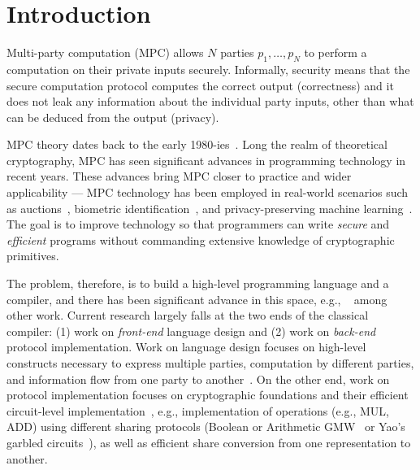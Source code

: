 \section{Introduction}
\label{sec:introduction}

Multi-party computation (MPC) allows $N$ parties $p_1,\dots, p_N$ to perform a computation on their private inputs securely. Informally, security means that the secure computation protocol computes the correct output (correctness) and it does not leak any information about the individual party inputs, other than what can be deduced from the output (privacy).


MPC theory dates back to the early 1980-ies~\cite{FOCS:Yao82b,STOC:GolMicWig87,STOC:BenGolWig88,STOC:ChaCreDam88}.
Long the realm of theoretical cryptography, MPC has seen significant advances in programming technology in recent years.
These advances bring MPC closer to practice and wider applicability ---
MPC technology has been employed in real-world scenarios such as auctions~\cite{FC:BCDGJK09}, biometric identification~\cite{ESORICS:BlaGas11},
and privacy-preserving machine learning~\cite{SP:MohZha17,CCS:MohRin18}.
The goal is to improve technology so that programmers can write \emph{secure} and \emph{efficient} programs without
commanding extensive knowledge of cryptographic primitives.

The problem, therefore, is to build a high-level programming language and a compiler, and there has been significant advance in
this space, e.g., ~\cite{CCS:BenNisPin08,ESORICS:BogLauWil08,CCS:ZhaSteBla13,Hastings:2019,Keller:2020,Acay:2021,Braun:2022} among other work.
Current research largely falls at the two ends
of the classical compiler: (1) work on \emph{front-end} language design and (2) work on \emph{back-end} protocol implementation. Work on language design
focuses on high-level constructs necessary to express multiple parties, computation by different parties, and information flow from one party
to another~\cite{SP:RasHamHic14, Acay:2021}. On the other end, work on protocol implementation focuses on cryptographic foundations and their efficient circuit-level
implementation~\cite{NDSS:DemSchZoh15, CCS:ABFKLO18, Braun:2022}, e.g., implementation of operations (e.g., MUL, ADD) using different sharing protocols
(Boolean or Arithmetic GMW~\cite{STOC:GolMicWig87} or Yao's garbled circuits~\cite{FOCS:Yao82b}), as well as efficient share conversion from one representation
to another.

